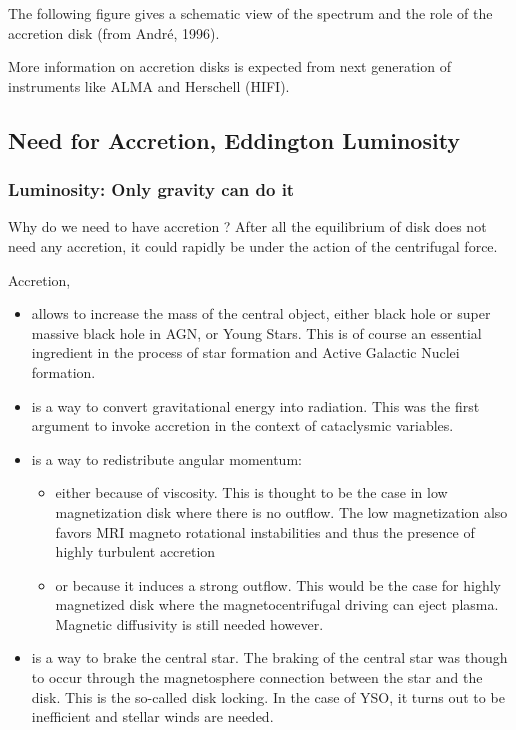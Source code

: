 \documentclass[10pt,a4paper,english]{article}
\begin{document}
The following figure gives a schematic view of the spectrum and the role of the
accretion disk (from André, 1996).


More information on accretion disks is expected from next generation of
instruments like ALMA and Herschell (HIFI).

\subsection{Need for Accretion, Eddington Luminosity}

\subsubsection{Luminosity: Only gravity can do it}

Why do we need to have accretion ? After all the equilibrium of disk does not
need any accretion, it could rapidly be under the action of the centrifugal
force.

Accretion,
\begin{itemize}
    \item allows to increase the mass of the central object, either black hole
          or super massive black hole in AGN, or Young Stars. This is of course
          an essential ingredient in the process of star formation and Active
          Galactic Nuclei formation.
    \item is a way to convert gravitational energy into radiation. This was the
          first argument to invoke accretion in the context of cataclysmic
          variables.
    \item is a way to redistribute angular momentum:
          \begin{itemize}
              \item either because of viscosity. This is thought to be the case
                    in low magnetization disk where there is no outflow. The
                    low magnetization also favors MRI magneto rotational
                    instabilities and thus the presence of highly turbulent
                    accretion
              \item or because it induces a strong outflow. This would be the
                    case for highly magnetized disk where the
                    magnetocentrifugal driving can eject plasma. Magnetic
                    diffusivity is still needed however.
          \end{itemize}
    \item is a way to brake the central star. The braking of the central star
          was though to occur through the magnetosphere connection between the
          star and the disk. This is the so-called disk locking. In the case of
          YSO, it turns out to be inefficient and stellar winds are needed.
\end{itemize}
\end{document}

